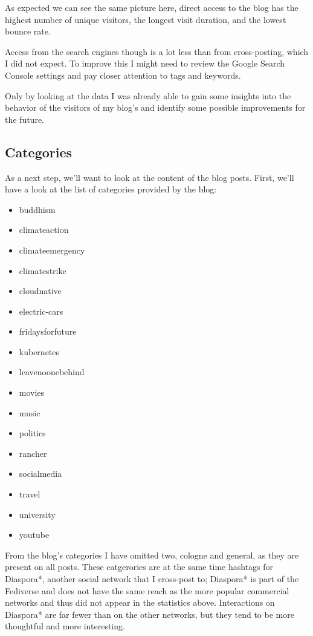 As expected we can see the same picture here, direct access to the blog has the highest number of unique visitors, the longest visit duration, and the lowest bounce rate.

Access from the search engines though is a lot less than from cross-posting, which I did not expect. To improve this I might need to review the Google Search Console settings and pay closer attention to tags and keywords.

Only by looking at the data I was already able to gain some insights into the behavior of the visitors of my blog's and identify some possible improvements for the future.

\subsection{Categories}

As a next step, we'll want to look at the content of the blog posts. First, we'll have a look at the list of categories provided by the blog:

\begin{itemize}
\item buddhism
\item climateaction
\item climateemergency
\item climatestrike
\item cloudnative
\item electric-cars
\item fridaysforfuture
\item kubernetes
\item leavenoonebehind
\item movies
\item music
\item politics
\item rancher
\item socialmedia
\item travel
\item university
\item youtube
\end{itemize}

From the blog's categories I have omitted two, cologne and general, as they are present on all posts. These catgerories are at the same time hashtags for Diaspora*, another social network that I cross-post to; Diaspora* is part of the Fediverse and does not have the same reach as the more popular commercial networks and thus did not appear in the statistics above. Interactions on Diaspora* are far fewer than on the other networks, but they tend to be more thoughtful and more interesting.

